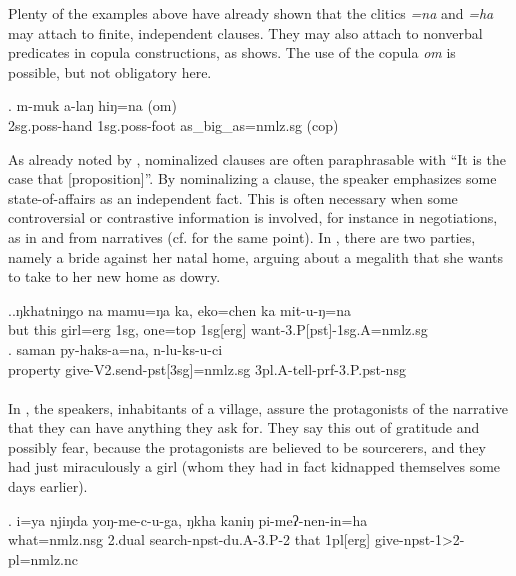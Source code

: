 Plenty of the examples above have already shown that the clitics \emph{=na} and \emph{=ha} may attach to finite, independent clauses.  They may also attach to nonverbal predicates in copula constructions, as \Next shows. The use of the  copula \emph{om} is possible, but not obligatory here.
	
	\exg. m-muk a-laŋ hiŋ=na (om)\\
 {\sc 2sg.poss-}hand {\sc 1sg.poss-}foot 	as\_big\_as{\sc =nmlz.sg} ({\sc cop})	\\
	
	
As already noted by \citet{Matisoff1972Lahu}, nominalized clauses are often paraphrasable with  “It is the case that [proposition]”. By nominalizing a clause, the speaker emphasizes some state-of-affairs as an independent fact. This is often necessary when some controversial or contrastive information is involved, for instance in negotiations, as in \Next and \NNext from narratives (cf. \citet{Bickel1999Nominalization} for the same point). In \Next, there are two parties, namely a bride against her natal home, arguing about  a megalith that she wants to take to her new home as dowry. 


\ex.\ag.ŋkhatniŋgo na  mamu=ŋa   ka, eko=chen ka mit-u-ŋ=na\\ 
	 but  this girl{\sc =erg}  {\sc 1sg}, one{\sc =top} {\sc 1sg[erg]} want{\sc -3.P[pst]-1sg.A=nmlz.sg}\\
\bg. saman   py-haks-a=na,  n-lu-ks-u-ci\\
property give-V2.send{\sc -pst[3sg]=nmlz.sg} {\sc 3pl.A}-tell{\sc -prf-3.P.pst-nsg}\\
  \\


In \Next, the speakers, inhabitants of a village, assure the protagonists of the narrative that they can have anything they ask for. They say this out of gratitude and possibly fear, because the protagonists are believed to be sourcerers, and they had just miraculously  a girl (whom they had in fact kidnapped themselves some days earlier). 


\exg.  i=ya  njiŋda yoŋ-me-c-u-ga, ŋkha kaniŋ  pi-meʔ-nen-in=ha\\
what{\sc =nmlz.nsg} {\sc 2.dual} search{\sc -npst-du.A-3.P-2} that {\sc 1pl[erg]}	give-{\sc npst-1>2-pl=nmlz.nc}\\
	 \\
	

